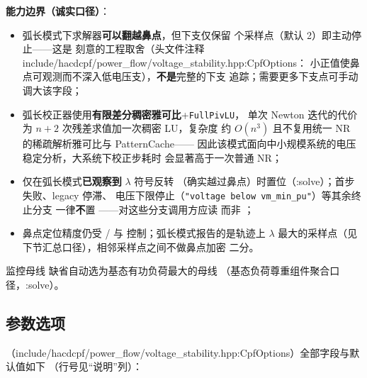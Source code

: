 \textbf{能力边界（诚实口径）}：
\begin{itemize}
  \item 弧长模式下求解器\textbf{可以翻越鼻点}，但下支仅保留
         个采样点（默认 2）即主动停止——这是
        刻意的工程取舍（头文件注释 include/hacdcpf/power\_flow/voltage\_stability.hpp:CpfOptions：
        小正值使鼻点可观测而不深入低电压支），\textbf{不是}完整的下支
        追踪；需要更多下支点可手动调大该字段；
  \item 弧长校正器使用\textbf{有限差分稠密雅可比}+\texttt{FullPivLU}，
        单次 Newton 迭代的代价为 $n+2$ 次残差求值加一次稠密 LU，复杂度
        约 $O(n^3)$ 且不复用统一 NR 的稀疏解析雅可比与 PatternCache——
        因此该模式面向中小规模系统的电压稳定分析，大系统下校正步耗时
        会显著高于一次普通 NR；
  \item {} 仅在弧长模式\textbf{已观察到} $\lambda$ 符号反转
        （确实越过鼻点）时置位（:solve）；首步失败、legacy 停滞、
        电压下限停止（\texttt{"voltage below vm\_min\_pu"}）等其余终止分支
        一律\textbf{不}置 ——对这些分支调用方应读
         而非 ；
  \item 鼻点定位精度仍受 / 与
         控制；弧长模式报告的是轨迹上 $\lambda$
        最大的采样点（见下节汇总口径），相邻采样点之间不做鼻点加密
        二分。
\end{itemize}
监控母线  缺省自动选为基态有功负荷最大的母线
（基态负荷尊重组件聚合口径，:solve）。

\subsection{参数选项}
（include/hacdcpf/power\_flow/voltage\_stability.hpp:CpfOptions）全部字段与默认值如下
（行号见“说明”列）：

